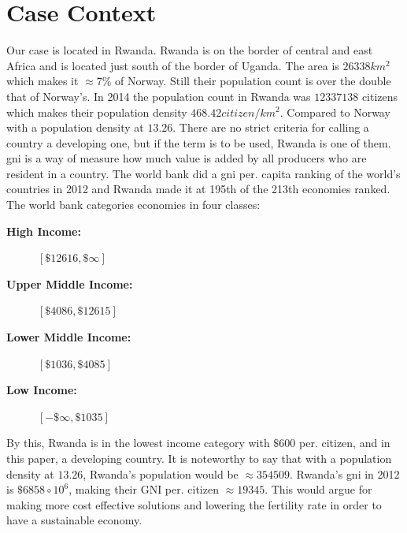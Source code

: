 \chapter{Case Context}
Our case is located in Rwanda. Rwanda is on the border of central and east Africa and is located just south of the border of Uganda. The area is $26338km^2$ which makes it $\approx 7\%$ of Norway. Still their population count is over the double that of Norway's. In 2014 the population count in Rwanda was $12337138$ citizens which makes their population density $468.42citizen/km^2$. Compared to Norway with a population density at $13.26$. There are no strict criteria for calling a country a developing one, but if the term is to be used, Rwanda is one of them. \gls{gni} is a way of measure how much value is added by all producers who are resident in a country. The world bank did a \gls{gni} per. capita ranking of the world's countries in 2012 and Rwanda made it at 195th of the 213th economies ranked. The world bank categories economies in four classes:
\begin{description}
\item[\textbf{High Income:}]{$[\$12616, \$\infty]$}
\item[\textbf{Upper Middle Income:}]{$[\$4086, \$12615]$}
\item[\textbf{Lower Middle Income:}]{$[\$1036, \$4085]$}
\item[\textbf{Low Income:}]{$[-\$\infty, \$1035]$}
\end{description}

By this, Rwanda is in the lowest income category with $\$600$ per. citizen, and in this paper, a developing country. It is noteworthy to say that with a population density at $13.26$, Rwanda's population would be $\approx 354509$. Rwanda's \gls{gni} in 2012 is $\$6858 \circ 10^{6}$, making their GNI per. citizen $\approx 19345$. This would argue for making more cost effective solutions and lowering the fertility rate in order to have a sustainable economy. 

\cite{rw:snl}
\cite{ssb:folketall}
\cite{gni:wb}
\cite{gni:wbper}

